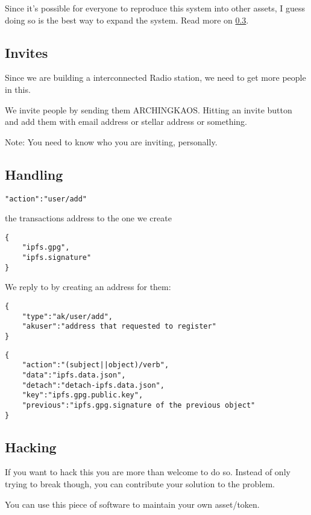 \documentclass[10pt,a4paper,twocolumn]{paper}
\begin{document}
Since it's possible for everyone to reproduce this system into other
assets, I guess doing so is the best way to expand the system. Read more
on \ref{hacking}.

	\subsection{Invites}\label{invites}

Since we are building a interconnected Radio station, we need to get
more people in this.

We invite people by sending them ARCHINGKAOS. Hitting an invite button
and add them with email address or stellar address or something.

Note: You need to know who you are inviting, personally.


	\subsection{Handling}\label{handling}


\begin{verbatim}
"action":"user/add"
\end{verbatim}

the transactions address to the one we create 
\begin{verbatim}
{
    "ipfs.gpg",
    "ipfs.signature"
}
\end{verbatim}

We reply to by creating an address for them:
\begin{verbatim}
{
    "type":"ak/user/add",
    "akuser":"address that requested to register"
}
\end{verbatim}

 \begin{verbatim} 	
{
    "action":"(subject||object)/verb",
    "data":"ipfs.data.json",
    "detach":"detach-ipfs.data.json",
    "key":"ipfs.gpg.public.key",
    "previous":"ipfs.gpg.signature of the previous object"
}
\end{verbatim}

	\subsection{Hacking}\label{hacking}

If you want to hack this you are more than welcome to do so. Instead of only trying to break though, you can contribute your solution to the problem.

You can use this piece of software to maintain your own asset/token.
\end{document}
